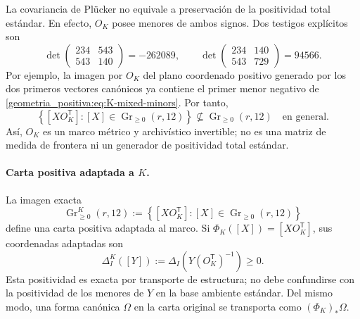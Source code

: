 La covariancia de Plücker no equivale a preservación de la positividad total
estándar. En efecto, \(O_K\) posee menores de ambos signos. Dos testigos
explícitos son
\begin{equation}
 \det\begin{pmatrix}234&543\\543&140\end{pmatrix}=-262089,
 \qquad
 \det\begin{pmatrix}234&140\\543&729\end{pmatrix}=94566.
 \label{geometria_positiva:eq:K-mixed-minors}
\end{equation}
Por ejemplo, la imagen por \(O_K\) del plano coordenado positivo generado por
los dos primeros vectores canónicos ya contiene el primer menor negativo de
\eqref{geometria_positiva:eq:K-mixed-minors}. Por tanto,
\begin{equation}
 \left\{[XO_K^{\mathsf T}]:
 [X]\in\operatorname{Gr}_{\ge0}(r,12)\right\}
 \not\subseteq\operatorname{Gr}_{\ge0}(r,12)
 \quad\text{en general}.
 \label{geometria_positiva:eq:K-not-standard-totally-positive}
\end{equation}
Así, \(O_K\) es un marco métrico y archivístico invertible; no es una matriz
de medida de frontera ni un generador de positividad total estándar.

\paragraph{Carta positiva adaptada a \(K\).}
La imagen exacta
\begin{equation}
 \operatorname{Gr}_{\ge0}^{K}(r,12)
 :=\left\{[XO_K^{\mathsf T}]:
 [X]\in\operatorname{Gr}_{\ge0}(r,12)\right\}
 \label{geometria_positiva:eq:K-adapted-positive-chart}
\end{equation}
define una carta positiva adaptada al marco. Si
\(\Phi_K([X])=[XO_K^{\mathsf T}]\), sus coordenadas adaptadas son
\begin{equation}
 \Delta_I^K([Y])
 :=\Delta_I\!\left(Y(O_K^{\mathsf T})^{-1}\right)\ge0.
 \label{geometria_positiva:eq:K-adapted-plucker}
\end{equation}
Esta positividad es exacta por transporte de estructura; no debe confundirse
con la positividad de los menores de \(Y\) en la base ambiente estándar. Del
mismo modo, una forma canónica \(\Omega\) en la carta original se transporta
como \((\Phi_K)_*\Omega\).


